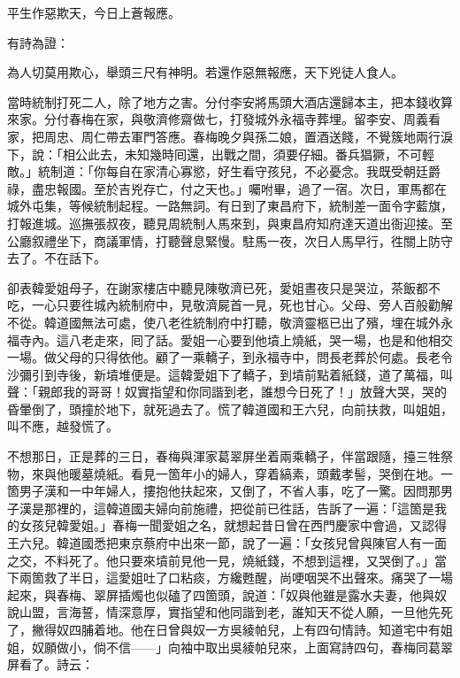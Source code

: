 平生作惡欺天，今日上蒼報應。

有詩為證：

為人切莫用欺心，舉頭三尺有神明。若還作惡無報應，天下兇徒人食人。

當時統制打死二人，除了地方之害。分付李安將馬頭大酒店還歸本主，把本錢收算來家。分付春梅在家，與敬濟修齋做七，打發城外永福寺葬埋。{}留李安、周義看家，把周忠、周仁帶去軍門答應。春梅晚夕與孫二娘，置酒送餞，不覺簇地兩行淚下，說：「相公此去，未知幾時囘還，出戰之間，須要仔細。番兵猖獗，不可輕敵。」統制道：「你每自在家清心寡慾，好生看守孩兒，不必憂念。我既受朝廷爵祿，盡忠報國。至於吉兇存亡，付之天也。」{}囑咐畢，過了一宿。次日，軍馬都在城外屯集，等候統制起程。一路無詞。有日到了東昌府下，統制差一面令字藍旗，打報進城。巡撫張叔夜，聽見周統制人馬來到，與東昌府知府達天道出衙迎接。至公廳叙禮坐下，商議軍情，打聽聲息緊慢。駐馬一夜，次日人馬早行，徃關上防守去了。不在話下。

卻表韓愛姐母子，在謝家樓店中聽見陳敬濟已死，愛姐晝夜只是哭泣，茶飯都不吃，一心只要徃城內統制府中，見敬濟屍首一見，死也甘心。{}父母、旁人百般勸解不從。韓道國無法可處，使八老徃統制府中打聽，敬濟靈柩已出了殯，埋在城外永福寺內。這八老走來，囘了話。愛姐一心要到他墳上燒紙，哭一場，也是和他相交一場。做父母的只得依他。顧了一乘轎子，到永福寺中，問長老葬於何處。長老令沙彌引到寺後，{}新墳堆便是。這韓愛姐下了轎子，到墳前點着紙錢，道了萬福，叫聲：「親郎我的哥哥！奴實指望和你同諧到老，誰想今日死了！」放聲大哭，哭的昏暈倒了，頭撞於地下，就死過去了。{}慌了韓道國和王六兒，向前扶救，叫姐姐，叫不應，越發慌了。

不想那日，正是葬的三日，春梅與渾家葛翠屏坐着兩乘轎子，伴當跟隨，擡三牲祭物，來與他暖墓燒紙。看見一箇年小的婦人，穿着縞素，頭戴孝髻，哭倒在地。一箇男子漢和一中年婦人，摟抱他扶起來，又倒了，不省人事，吃了一驚。因問那男子漢是那裡的，這韓道國夫婦向前施禮，把從前已徃話，告訴了一遍：「這箇是我的女孩兒韓愛姐。」春梅一聞愛姐之名，就想起昔日曾在西門慶家中會過，又認得王六兒。韓道國悉把東京蔡府中出來一節，說了一遍：「女孩兒曾與陳官人有一面之交，不料死了。他只要來墳前見他一見，燒紙錢，不想到這裡，又哭倒了。」當下兩箇救了半日，這愛姐吐了口粘痰，方纔甦醒，尚哽咽哭不出聲來。痛哭了一場起來，與春梅、翠屏插燭也似磕了四箇頭，{}說道：「奴與他雖是露水夫妻，他與奴說山盟，言海誓，情深意厚，實指望和他同諧到老，誰知天不從人願，一旦他先死了，撇得奴四脯着地。他在日曾與奴一方吳綾帕兒，上有四句情詩。知道宅中有姐姐，奴願做小，倘不信——」向袖中取出吳綾帕兒來，上面寫詩四句，春梅同葛翠屏看了。詩云：

